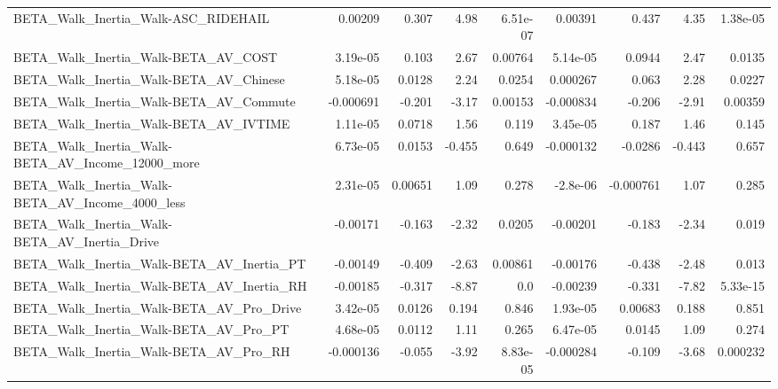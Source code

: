 \begin{tabular}{lrrrrrrrr}
BETA\_Walk\_Inertia\_Walk-ASC\_RIDEHAIL                &     0.00209 &        0.307 &     4.98 & 6.51e-07 &    0.00391 &       0.437 &         4.35 &      1.38e-05 \\
BETA\_Walk\_Inertia\_Walk-BETA\_AV\_COST                &    3.19e-05 &        0.103 &     2.67 &  0.00764 &   5.14e-05 &      0.0944 &         2.47 &        0.0135 \\
BETA\_Walk\_Inertia\_Walk-BETA\_AV\_Chinese             &    5.18e-05 &       0.0128 &     2.24 &   0.0254 &   0.000267 &       0.063 &         2.28 &        0.0227 \\
BETA\_Walk\_Inertia\_Walk-BETA\_AV\_Commute             &   -0.000691 &       -0.201 &    -3.17 &  0.00153 &  -0.000834 &      -0.206 &        -2.91 &       0.00359 \\
BETA\_Walk\_Inertia\_Walk-BETA\_AV\_IVTIME              &    1.11e-05 &       0.0718 &     1.56 &    0.119 &   3.45e-05 &       0.187 &         1.46 &         0.145 \\
BETA\_Walk\_Inertia\_Walk-BETA\_AV\_Income\_12000\_more   &    6.73e-05 &       0.0153 &   -0.455 &    0.649 &  -0.000132 &     -0.0286 &       -0.443 &         0.657 \\
BETA\_Walk\_Inertia\_Walk-BETA\_AV\_Income\_4000\_less    &    2.31e-05 &      0.00651 &     1.09 &    0.278 &   -2.8e-06 &   -0.000761 &         1.07 &         0.285 \\
BETA\_Walk\_Inertia\_Walk-BETA\_AV\_Inertia\_Drive       &    -0.00171 &       -0.163 &    -2.32 &   0.0205 &   -0.00201 &      -0.183 &        -2.34 &         0.019 \\
BETA\_Walk\_Inertia\_Walk-BETA\_AV\_Inertia\_PT          &    -0.00149 &       -0.409 &    -2.63 &  0.00861 &   -0.00176 &      -0.438 &        -2.48 &         0.013 \\
BETA\_Walk\_Inertia\_Walk-BETA\_AV\_Inertia\_RH          &    -0.00185 &       -0.317 &    -8.87 &      0.0 &   -0.00239 &      -0.331 &        -7.82 &      5.33e-15 \\
BETA\_Walk\_Inertia\_Walk-BETA\_AV\_Pro\_Drive           &    3.42e-05 &       0.0126 &    0.194 &    0.846 &   1.93e-05 &     0.00683 &        0.188 &         0.851 \\
BETA\_Walk\_Inertia\_Walk-BETA\_AV\_Pro\_PT              &    4.68e-05 &       0.0112 &     1.11 &    0.265 &   6.47e-05 &      0.0145 &         1.09 &         0.274 \\
BETA\_Walk\_Inertia\_Walk-BETA\_AV\_Pro\_RH              &   -0.000136 &       -0.055 &    -3.92 & 8.83e-05 &  -0.000284 &      -0.109 &        -3.68 &      0.000232 \\

\end{tabular}
